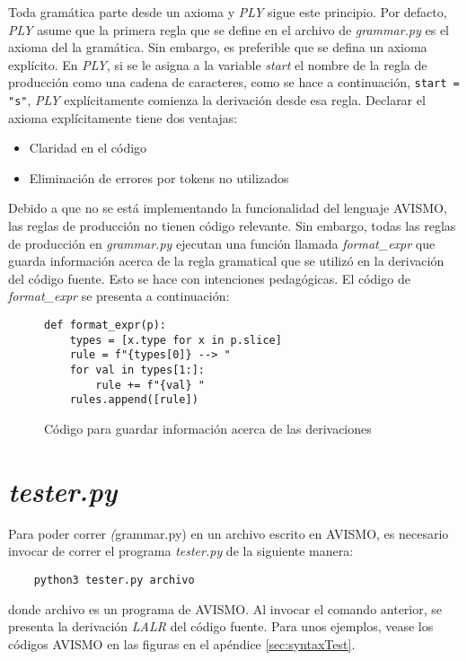 Toda gramática parte desde un axioma y \textit{PLY} sigue este principio.
Por defacto, \textit{PLY} asume que la primera regla que se define en el archivo de \textit{grammar.py} es el axioma del la gramática.
Sin embargo, es preferible que se defina un axioma explícito.
En \textit{PLY}, si se le asigna a la variable \textit{start} el nombre de la regla de producción como una cadena de caracteres, como se hace a continuación, \texttt{start = "s"}, \textit{PLY} explícitamente comienza la derivación desde esa regla. Declarar el axioma explícitamente tiene dos ventajas:
\begin{itemize}
	\item Claridad en el código
	\item Eliminación de errores por tokens no utilizados
\end{itemize}

Debido a que no se está implementando la funcionalidad del lenguaje AVISMO, las reglas de producción no tienen código relevante. Sin embargo, todas las reglas de producción en \textit{grammar.py} ejecutan una función llamada \textit{format\_expr} que guarda información acerca de la regla gramatical que se utilizó en la derivación del código fuente.
Esto se hace con intenciones pedagógicas.
El código de \textit{format\_expr} se presenta a continuación:
\begin{figure}[H]
	\begin{verbatim}
def format_expr(p):
    types = [x.type for x in p.slice]
    rule = f"{types[0]} --> "
    for val in types[1:]:
        rule += f"{val} "
    rules.append([rule])
\end{verbatim}
	\caption{Código para guardar información acerca de las derivaciones}
	\label{fig: formatExpr}
\end{figure}

\section{\textit{tester.py}}

Para poder correr \textit(grammar.py) en un archivo escrito en AVISMO, es necesario invocar de correr el programa \textit{tester.py} de la siguiente manera:
\begin{verbatim}
	python3 tester.py archivo
\end{verbatim}
donde archivo es un programa de AVISMO.
Al invocar el comando anterior, se presenta la derivación \textit{LALR} del código fuente.
Para unos ejemplos, vease los códigos AVISMO en las figuras en el apéndice \ref{sec:syntaxTest}.




